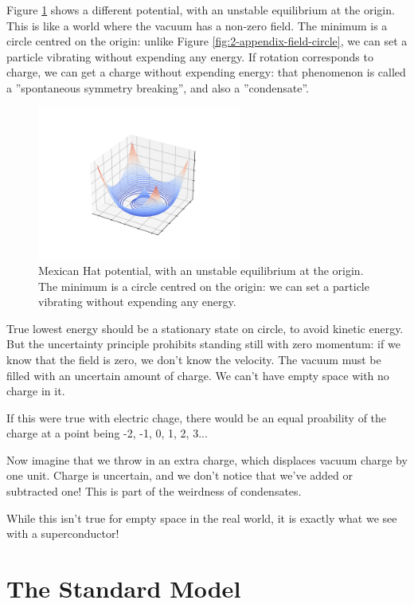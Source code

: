 \documentclass[]{article}
\begin{document}
Figure \ref{fig:mexican-hat} shows a different potential, with an unstable equilibrium at the origin. This is like a world where the vacuum has a non-zero field. The minimum is a circle centred on the origin: unlike Figure \ref{fig:2-appendix-field-circle}, we can set a particle vibrating without expending any energy. If rotation corresponds to charge, we can get a charge without expending energy: that phenomenon is called a ''spontaneous symmetry breaking'', and also a ''condensate''.
\begin{figure}[H]
	\begin{center}
		\caption[Mexican Hat potential]{Mexican Hat potential, with an unstable equilibrium at the origin.  The minimum is a circle centred on the origin: we can set a particle vibrating without expending any energy.}\label{fig:mexican-hat}
		\includegraphics[width=0.6\textwidth]{mexican-hat}
	\end{center}
\end{figure}

True lowest energy should be a stationary state on circle, to avoid kinetic energy. But the uncertainty principle prohibits standing still with zero momentum: if we know that the field is zero, we don't know the velocity. The vacuum must be filled with an uncertain amount of charge.  We can't have empty space with no charge in it.

If this were true with electric chage, there would be an equal proability of the charge at a point being -2, -1, 0, 1, 2, 3...

Now imagine that we throw in an extra charge, which displaces vacuum charge by one unit. Charge is uncertain, and we don't notice that we've added or subtracted one! This is part of the weirdness of condensates.

While this isn't true for empty space in the real world, it is exactly what we see with a superconductor!

\section{The Standard Model}
\end{document}
